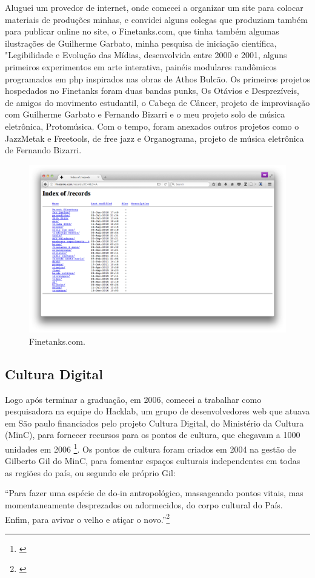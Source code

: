 Aluguei um provedor de internet, onde comecei a organizar um site para colocar materiais de produções minhas, e convidei alguns colegas que produziam também para publicar online no site, o Finetanks.com, que tinha também algumas ilustrações de Guilherme Garbato, minha pesquisa de iniciação científica, "Legibilidade e Evolução das Mídias, desenvolvida entre 2000 e 2001, alguns primeiros experimentos em arte interativa, painéis modulares randômicos programados em php inspirados nas obras de Athos Bulcão.  
Os primeiros projetos hospedados no Finetanks foram duas bandas punks, Os Otávios e Desprezíveis, de amigos do movimento estudantil, o Cabeça de Câncer, projeto de improvisação com Guilherme Garbato e Fernando Bizarri e o meu projeto solo de música eletrônica, Protomúsica. Com o tempo, foram anexados outros projetos como o JazzMetak e Freetools, de free jazz e Organograma, projeto de música eletrônica de Fernando Bizarri.

\begin{figure}

\includegraphics[width=1\textwidth]{pictures/cap1/finetanksrecords}
\caption{Finetanks.com.}
\label{fig:finetanks}
\end{figure}


\subsection{Cultura Digital}

Logo após terminar a graduação, em 2006, comecei a trabalhar como pesquisadora na equipe do Hacklab, um grupo de desenvolvedores web que atuava em São paulo financiados pelo projeto Cultura Digital, do Ministério da Cultura (MinC), para fornecer recursos para os pontos de cultura, que chegavam a 1000 unidades em 2006 \footnote{\cite[6]{Lima2009}}. Os pontos de cultura foram criados em 2004 na gestão de Gilberto Gil do MinC, para fomentar espaços culturais independentes em todas as regiões do país, ou segundo ele próprio Gil:
\begin{citacao}

``Para fazer uma espécie de do-in antropológico, massageando pontos vitais, mas momentaneamente desprezados ou adormecidos, do corpo cultural do País. Enfim, para avivar o velho e atiçar o novo.''\footnote{\cite{GilbertoGil2003}} 
\end{citacao}

